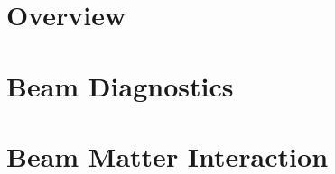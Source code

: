 \documentclass[12pt,twoside,openright]{report}
\begin{document}


\pagestyle{plain}




\chapter{Overview} \label{ch:Overview}



\chapter{Beam Diagnostics} \label{ch:BeamDiagnostics}



\chapter{Beam Matter Interaction} \label{ch:BeamMatterInter}





\label{ch:H0Hm}




\printbibliography 
\end{document}
